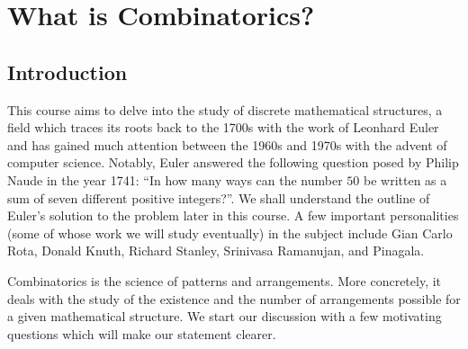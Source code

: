 \chapter{What is Combinatorics?}
\section{Introduction}
This course aims to delve into the study of discrete mathematical structures, a field which traces its roots back to the 1700s with the work of Leonhard Euler and has gained much attention between the 1960s and 1970s with the advent of computer science. Notably, Euler answered the following question posed by Philip Naude in the year 1741: “In how many ways can the number $50$ be written as a sum of seven different positive integers?”. We shall understand the outline of Euler’s solution to the problem later in this course. A few important personalities (some of whose work we will study eventually) in the subject include Gian Carlo Rota, Donald Knuth, Richard Stanley, Srinivasa Ramanujan, and Pinagala. 

Combinatorics is the science of patterns and arrangements. More concretely, it deals with the study of the existence and the number of arrangements possible for a given mathematical structure. We start our discussion with a few motivating questions which will make our statement clearer.

